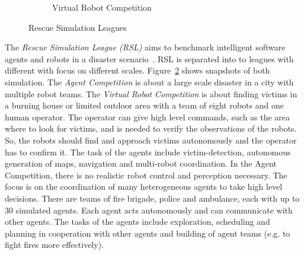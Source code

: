 \begin{figure}
\begin{subfigure}[b]{0.48\textwidth}
    \caption{Virtual Robot Competition~\cite{rescue_simulation_league}}
    \label{fig:rescue_vrc}
  \end{subfigure}
  \caption{Rescue Simulation Leagues}
  \label{fig:rescue}
\end{figure}
The \textit{Rescue Simulation League (RSL)} aims to benchmark intelligent software agents and robots in a disaster scenario~\cite{rescue_simulation_league}. RSL is separated into to leagues with different with focus on different scales. Figure~\ref{fig:rescue} shows snapshots of both simulation. The \textit{Agent Competition} is about a large scale disaster in a city with multiple robot teams. The \textit{Virtual Robot Competition} is about finding victims in a burning house or limited outdoor area with a team of eight robots and one human operator. The operator can give high level commands, such as the area where to look for victims, and is needed to verify the observations of the robots. So, the robots should find and approach victims autonomously and the operator has to confirm it. The task of the agents include victim-detection, autonomous generation of maps, navigation and multi-robot coordination. In the Agent Competition, there is no realistic robot control and perception necessary. The focus is on the coordination of many heterogeneous agents to take high level decisions. There are teams of fire brigade, police and ambulance, each with up to 30 simulated agents. Each agent acts autonomously and can communicate with other agents. The tasks of the agents include exploration, scheduling and planning in cooperation with other agents and building of agent teams (e.g. to fight fires more effectively).\\
